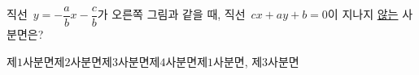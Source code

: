 \noindent\begin{minipage}[t]{0.58\linewidth}\vspace{0pt}직선~$y=-\dfrac{a}{b}x-\dfrac{c}{b}$가 오른쪽 그림과 같을 때, 직선~$cx+ay+b=0$이 지나지 \underline{않는} 사분면은?\end{minipage}\hfill\begin{minipage}[t]{0.4\linewidth}\vspace{0pt}\centering \end{minipage}\par
\begin{choicesii}{제$1$사분면}{제$2$사분면}{제$3$사분면}{제$4$사분면}{제$1$사분면, 제$3$사분면}\end{choicesii}
